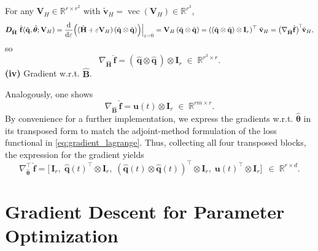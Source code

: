 For any $\mathbf{V}_H\in\mathbb{R}^{r\times r^2}$ with $\tilde{\mathbf{v}}_H=\operatorname{vec}(\mathbf{V}_H)\in\mathbb{R}^{r^3}$,\\
$$\bm{D}_{\hat{\mathbf{H}}}~\hat{\mathbf{f}}(\hat{\mathbf{q}},\hat{\bm{\theta}};\mathbf{V}_H)=\dv{}{\varepsilon}\Bigl((\hat{\mathbf{H}}+\varepsilon\mathbf{V}_H)\,(\hat{\mathbf{q}}\otimes\hat{\mathbf{q}})\Bigr)\Big|_{\varepsilon=0}=\mathbf{V}_H\,(\hat{\mathbf{q}}\otimes\hat{\mathbf{q}})=((\hat{\mathbf{q}}\otimes\hat{\mathbf{q}})\otimes\mathbf{I}_r)^{\top}\;\tilde{\mathbf{v}}_H=\bigl(\nabla_{\hat{\mathbf{H}}}\hat{\mathbf{f}}\bigr)^{\!\top}\!\tilde{\mathbf{v}}_H,$$
so\\
$$\nabla_{\hat{\mathbf{H}}}\,\hat{\mathbf{f}}=(\,\hat{\mathbf{q}}\otimes\hat{\mathbf{q}}\,)\otimes\mathbf{I}_r\;\in\;\mathbb{R}^{r^3\times r}.$$
\noindent\textbf{(iv)} Gradient w.r.t. $\hat{\mathbf{B}}$.

Analogously, one shows\\
$$\nabla_{\hat{\mathbf{B}}}\,\hat{\mathbf{f}}=\mathbf{u}(t)\otimes\mathbf{I}_r\;\in\;\mathbb{R}^{rm\times r}.$$
By convenience for a further implementation, we express the gradients w.r.t. $\hat{\bm{\theta}}$ in its transposed form to match the adjoint-method formulation of the loss functional in \eqref{eq:gradient_lagrange}.
Thus, collecting all four transposed blocks, the expression for the gradient yields\\
\begin{equation}
  \label{eq:gradient_2}
  \nabla_{\hat{\bm{\theta}}}^{\top}\,\hat{\mathbf{f}}=\bigl[\,\mathbf{I}_r,\;\hat{\mathbf{q}}(t)^{\!\top}\otimes\mathbf{I}_r,\;(\hat{\mathbf{q}}(t)\otimes\hat{\mathbf{q}}(t))^{\!\top}\otimes\mathbf{I}_r,\;\mathbf{u}(t)^{\!\top}\otimes\mathbf{I}_r\bigr]~~\in\;\mathbb{R}^{r\times d}.
\end{equation}


\section{Gradient Descent for Parameter Optimization}
\label{sec:gd_opt}

